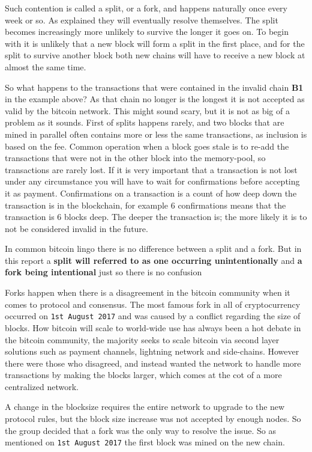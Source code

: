 Such contention is called a split, or a fork, and happens naturally once every week or so. As explained they will eventually resolve themselves. The split becomes increasingly more unlikely to survive the longer it goes on. To begin with it is unlikely that a new block will form a split in the first place, and for the split to survive another block both new chains will have to receive a new block at almost the same time.\cite{antonopoulos_2017}

So what happens to the transactions that were contained in the invalid chain \textbf{B1} in the example above? As that chain no longer is the longest it is not accepted as valid by the bitcoin network. This might sound scary, but it is not as big of a problem as it sounds. First of splits happens rarely, and two blocks that are mined in parallel often contains more or less the same transactions, as inclusion is based on the fee. Common operation when a block goes stale is to re-add the transactions that were not in the other block into the memory-pool, so transactions are rarely lost. If it is very important that a transaction is not lost under any circumstance you will have to wait for confirmations before accepting it as payment. Confirmations on a transaction is a count of how deep down the transaction is in the blockchain, for example 6 confirmations means that the transaction is 6 blocks deep. The deeper the transaction is; the more likely it is to not be considered invalid in the future.

In common bitcoin lingo there is no difference between a split and a fork. But in this report a \textbf{split will referred to as one occurring unintentionally} and \textbf{a fork being intentional} just so there is no confusion

Forks happen when there is a disagreement in the bitcoin community when it comes to protocol and consensus. The most famous fork in all of cryptocurrency occurred on \texttt{1st August 2017} and was caused by a conflict regarding the size of blocks. How bitcoin will scale to world-wide use has always been a hot debate in the bitcoin community, the majority seeks to scale bitcoin via second layer solutions such as payment channels, lightning network and side-chains. However there were those who disagreed, and instead wanted the network to handle more transactions by making the blocks larger, which comes at the cot of a more centralized network. 

A change in the blocksize requires the entire network to upgrade to the new protocol rules, but the block size increase was not accepted by enough nodes. So the group decided that a fork was the only way to resolve the issue. So as mentioned on \texttt{1st August 2017} the first block was mined on the new chain.\cite{selena_2017}

